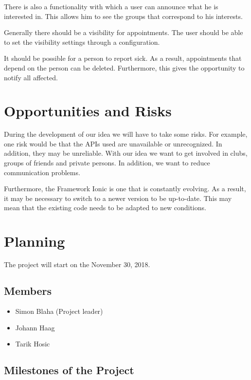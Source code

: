 \documentclass[12pt]{scrartcl}
\begin{document}
        There is also a functionality with which a user can announce what he is interested in.
        This allows him to see the groups that correspond to his interests.
        
        Generally there should be a visibility for appointments.
        The user should be able to set the  visibility settings through a configuration.
        
        It should be possible for a person to report sick. As a result, appointments that depend on the person can be deleted. 
        Furthermore, this gives the opportunity to notify all affected.
    \pagebreak

    \section{Opportunities and Risks}

        During the development of our idea we will have to take some risks. For example, one risk would be that the APIs used are unavailable or unrecognized. In addition, they may be unreliable.
        With our idea we want to get involved in clubs, groups of friends and private persons.
        In addition, we want to reduce communication problems.
       

        Furthermore, the Framework Ionic is one that is constantly evolving. As a result, it may be necessary to switch to a newer version to be up-to-date.
        This may mean that the existing code needs to be adapted to new conditions.
    \pagebreak

    \section{Planning}

    \vspace*{15pt}

    The project will start on the November 30, 2018.

    \subsection{Members}
    \begin{itemize}
        \item Simon Blaha (Project leader)
        \item Johann Haag
        \item Tarik Hosic
    \end{itemize}

    \subsection{Milestones of the Project}
    
\end{document}
